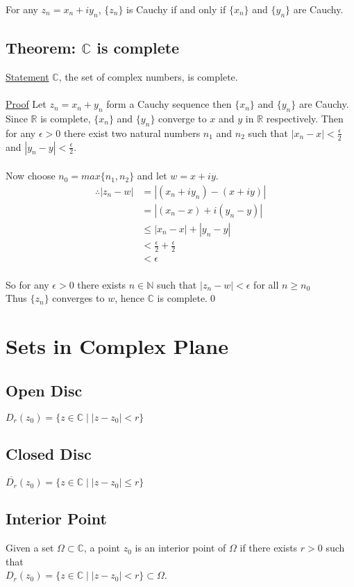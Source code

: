 \documentclass{article}
\begin{document}
For any $z_n=x_n+iy_n$, $\{z_n\}$ is Cauchy if and only if $\{x_n\}$ and $\{y_n\}$ are Cauchy.
\subsection{Theorem: $\mathbb{C}$ is complete}
\underline{Statement} $\mathbb{C}$, the set of complex numbers, is complete.
\\
\\

\underline{Proof} Let $z_n=x_n+y_n$ form a Cauchy sequence then $\{x_n\}$ and $\{y_n\}$ are Cauchy. Since $\mathbb{R}$ is complete, $\{x_n\}$ and $\{y_n\}$ converge to $x$ and $y$ in $\mathbb{R}$ respectively. Then for any $\epsilon>0$ there exist two natural numbers $n_1$ and $n_2$ such that $|x_n-x|<\frac{\epsilon}{2}$ and $|y_n-y|<\frac{\epsilon}{2}$.
\\
\\
Now choose $n_0=max\{n_1, n_2\}$ and let $w=x+iy$.
\\
 \begin{align}
     \therefore |z_n-w|&= |(x_n+iy_n)-(x+iy)| \\
     &=|(x_n-x)+i(y_n-y)|\\
     &\leq|x_n-x|+|y_n-y|\\
     &<\frac{\epsilon}{2}+\frac{\epsilon}{2}\\
     &<\epsilon
 \end{align}
\\
So for any $\epsilon>0$ there exists $n \in \mathbb{N}$ such that $|z_n-w|<\epsilon$ for all $n \geq n_0$
\\
Thus $\{z_n\}$ converges to $w$, hence $\mathbb{C}$ is complete.\qed
\\
\section{Sets in Complex Plane}
\subsection{Open Disc}
$D_r(z_0)=\{z\in \mathbb{C} \mid |z-z_0|<r\}$
\subsection{Closed Disc}
$\overline{D_r}(z_0)=\{z\in \mathbb{C} \mid |z-z_0| \leq r\} $
\subsection{Interior Point}
Given a set $\Omega \subset \mathbb{C}$, a point $z_0$ is an interior point of $\Omega$ if there exists $r>0$ such that
\\
$D_r(z_0)=\{z\in \mathbb{C} \mid |z-z_0|<r\} \subset \Omega$.
\end{document}
